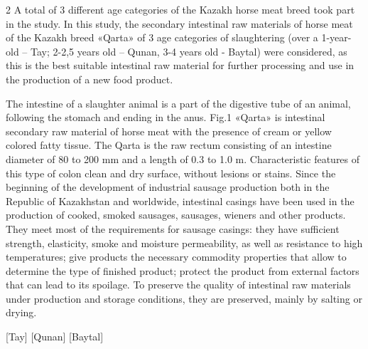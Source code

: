 \begin{multicols}{2}
A total of 3 different age categories of the Kazakh horse meat breed
took part in the study. In this study, the secondary intestinal raw
materials of horse meat of the Kazakh breed «Qarta» of 3 age categories
of slaughtering (over a 1-year-old -- Tay; 2-2,5 years old -- Qunan, 3-4
years old - Baytal) were considered, as this is the best suitable
intestinal raw material for further processing and use in the production
of a new food product.

The intestine of a slaughter animal is a part of the digestive tube of
an animal, following the stomach and ending in the anus. Fig.1 «Qarta»
is intestinal secondary raw material of horse meat with the presence of
cream or yellow colored fatty tissue. The Qarta is the raw rectum
consisting of an intestine diameter of 80 to 200 mm and a length of 0.3
to 1.0 m. Characteristic features of this type of colon clean and dry
surface, without lesions or stains. Since the beginning of the
development of industrial sausage production both in the Republic of
Kazakhstan and worldwide, intestinal casings have been used in the
production of cooked, smoked sausages, sausages, wieners and other
products. They meet most of the requirements for sausage casings: they
have sufficient strength, elasticity, smoke and moisture permeability,
as well as resistance to high temperatures; give products the necessary
commodity properties that allow to determine the type of finished
product; protect the product from external factors that can lead to its
spoilage. To preserve the quality of intestinal raw materials under
production and storage conditions, they are preserved, mainly by salting
or drying.
\end{multicols}

\begin{figs}
    [Tay]
    [Qunan]
    [Baytal]
\end{figs}

